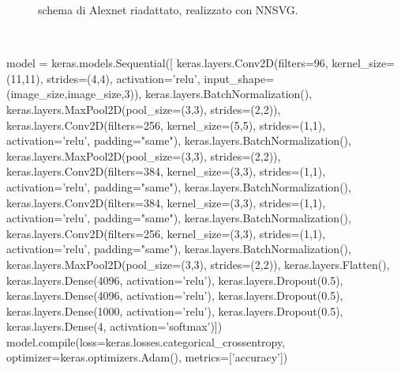 \begin{enumerate}
\begin{figure}[hb!]
        \caption{\small{schema di Alexnet riadattato, realizzato con NNSVG.} %
        } %
        \label{fi:dcalc}
      \end{figure}
      \\
\newpage
\begin{python}
model = keras.models.Sequential([
keras.layers.Conv2D(filters=96, kernel_size=(11,11), strides=(4,4), activation='relu', input_shape=(image_size,image_size,3)),
keras.layers.BatchNormalization(),
keras.layers.MaxPool2D(pool_size=(3,3), strides=(2,2)),
keras.layers.Conv2D(filters=256, kernel_size=(5,5), strides=(1,1), activation='relu', padding="same"),
keras.layers.BatchNormalization(),
keras.layers.MaxPool2D(pool_size=(3,3), strides=(2,2)),
keras.layers.Conv2D(filters=384, kernel_size=(3,3), strides=(1,1), activation='relu', padding="same"),
keras.layers.BatchNormalization(),
keras.layers.Conv2D(filters=384, kernel_size=(3,3), strides=(1,1), activation='relu', padding="same"),
keras.layers.BatchNormalization(),
keras.layers.Conv2D(filters=256, kernel_size=(3,3), strides=(1,1), activation='relu', padding="same"),
keras.layers.BatchNormalization(),
keras.layers.MaxPool2D(pool_size=(3,3), strides=(2,2)),
keras.layers.Flatten(),
keras.layers.Dense(4096, activation='relu'),
keras.layers.Dropout(0.5),
keras.layers.Dense(4096, activation='relu'),
keras.layers.Dropout(0.5),
keras.layers.Dense(1000, activation='relu'),
keras.layers.Dropout(0.5),
keras.layers.Dense(4, activation='softmax')])
model.compile(loss=keras.losses.categorical_crossentropy, optimizer=keras.optimizers.Adam(), metrics=['accuracy'])
    \end{python}
    \begin{lstlisting}[caption= {Codice Python del modello di AlexNet riadattato.} ]
    \end{lstlisting}


\end{enumerate}
